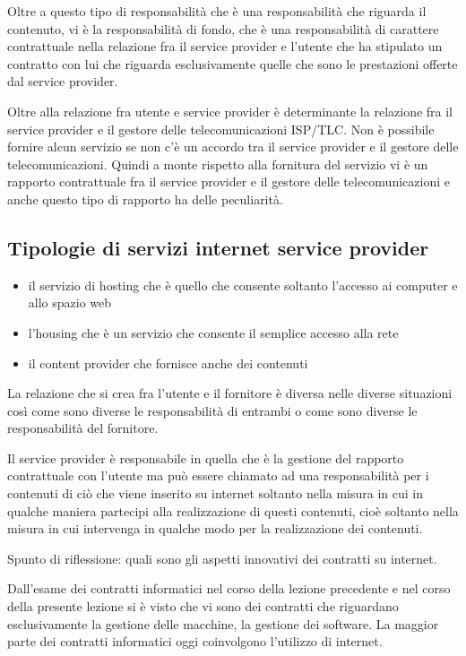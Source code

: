 Oltre a questo tipo di responsabilità che è una responsabilità che riguarda il contenuto, vi è la responsabilità di fondo, che è una responsabilità di carattere contrattuale nella relazione fra il service provider e l'utente che ha stipulato un contratto con lui che riguarda esclusivamente quelle che sono le prestazioni offerte dal service provider. 

Oltre alla relazione fra utente e service provider è determinante la relazione fra il service provider e il gestore delle telecomunicazioni ISP/TLC. Non è possibile fornire alcun servizio se non c'è un accordo tra il service provider e il gestore delle telecomunicazioni. Quindi a monte rispetto alla fornitura del servizio vi è un rapporto contrattuale fra il service provider e il gestore delle telecomunicazioni e anche questo tipo di rapporto ha delle peculiarità. 

\subsection{Tipologie di servizi internet service provider}

\begin{itemize}
    \item il servizio di hosting che è quello che consente soltanto l'accesso ai computer e allo spazio web
    \item l'housing che è un servizio che consente il semplice accesso alla rete
    \item il content provider che fornisce anche dei contenuti
\end{itemize}

La relazione che si crea fra l'utente e il fornitore è diversa nelle diverse situazioni così come sono diverse le responsabilità di entrambi o come sono diverse le responsabilità del fornitore. 

Il service provider è responsabile in quella che è la gestione del rapporto contrattuale con l'utente ma può essere chiamato ad una responsabilità per i contenuti di ciò che viene inserito su internet soltanto nella misura in cui in qualche maniera partecipi alla realizzazione di questi contenuti, cioè soltanto nella misura in cui intervenga in qualche modo per la realizzazione dei contenuti. 

Spunto di riflessione: quali sono gli aspetti innovativi dei contratti su internet. 

Dall'esame dei contratti informatici nel corso della lezione precedente e nel corso della presente lezione si è visto che vi sono dei contratti che riguardano esclusivamente la gestione delle macchine, la gestione dei software. La maggior parte dei contratti informatici oggi coinvolgono l'utilizzo di internet. 

